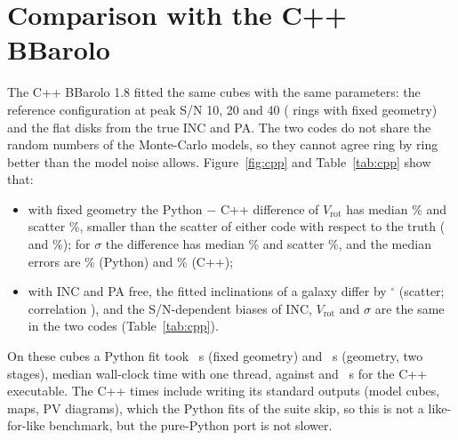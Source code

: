\documentclass[10pt,a4paper]{article}
\newcommand{\vrot}{V_\mathrm{rot}}
\newcommand{\rmax}{R_\mathrm{max}}
\newcommand{\code}[1]{\texttt{#1}}
\begin{document}
\begin{table}[tbp]
\centering\small
\caption{Inclination bias at S/N 200 (flat disks with INC = 45--75$^\circ$). A: 3DFIT fits from the true
INC and PA with DELTAINC = $15^\circ$ (six galaxies; median and range over the galaxies). B: position of
the minimum of the residual function of single rings (rings beyond $0.35\,\rmax$ of three galaxies), with
$\vrot$, $\sigma$ and PA at the true values and noise-free models (GALMODTYPE = ANALYTIC), scanned in steps
of $0.5^\circ$ from $-12^\circ$ to $+6^\circ$. Made by \code{diag\_incbias.py}.}
\label{tab:incbias}

\end{table}

\section{Comparison with the C++ BBarolo}\label{sec:cpp}

The C++ BBarolo 1.8 fitted the same cubes with the same parameters: the reference configuration at peak
S/N 10, 20 and 40 (\CppN{} rings with fixed geometry) and the \CppGeoN{} flat disks from the true INC and
PA. The two codes do not share the random numbers of the Monte-Carlo models, so they cannot agree ring
by ring better than the model noise allows. Figure~\ref{fig:cpp} and Table~\ref{tab:cpp} show that:
\begin{itemize}
\item with fixed geometry the Python $-$ C++ difference of $\vrot$ has median \CppVMed\% and scatter
  \CppVSig\%, smaller than the scatter of either code with respect to the truth (\CppVpySig{} and
  \CppVcppSig\%); for $\sigma$ the difference has median \CppSMed\% and scatter \CppSSig\%, and the median
  errors are \CppSpyMed\% (Python) and \CppScppMed\% (C++);
\item with INC and PA free, the fitted inclinations of a galaxy differ by \CppGeoDiff$^\circ$ (scatter;
  correlation \CppGeoCorr), and the S/N-dependent biases of INC, $\vrot$ and $\sigma$ are the same in the
  two codes (Table~\ref{tab:cpp}).
\end{itemize}
On these cubes a Python fit took \TimePyRes{}~s (fixed geometry) and \TimePyGeo{}~s (geometry, two
stages), median wall-clock time with one thread, against \TimeCppRes{} and \TimeCppGeo{}~s for the C++
executable. The C++ times include writing its standard outputs (model cubes, maps, PV diagrams), which the
Python fits of the suite skip, so this is not a like-for-like benchmark, but the pure-Python port is not
slower.
\end{document}
